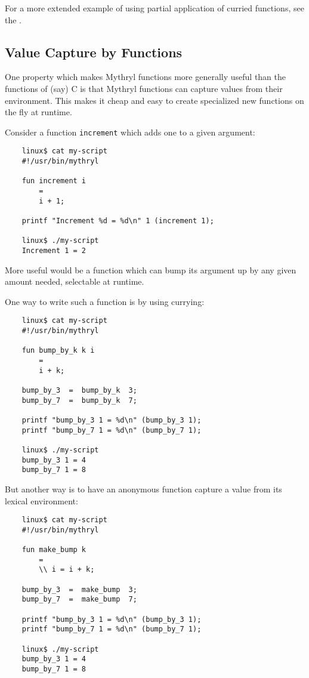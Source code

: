 For a more extended example of using partial application of 
curried functions, see the 
.


\cutend*


\subsection{Value Capture by Functions}
\label{section:ref:functions:value-capture-by-functions}

One property which makes Mythryl functions more generally useful than the 
functions of (say) C is that Mythryl functions can capture values from 
their environment.  This makes it cheap and easy to create specialized 
new functions on the fly at runtime.

Consider a function {\tt increment} which adds one to a given argument:

\begin{verbatim}
    linux$ cat my-script
    #!/usr/bin/mythryl

    fun increment i
        =
        i + 1;

    printf "Increment %d = %d\n" 1 (increment 1);

    linux$ ./my-script
    Increment 1 = 2
\end{verbatim}

More useful would be a function which can bump its argument up 
by any given amount needed, selectable at runtime.

One way to write such a function is by using currying:

\begin{verbatim}
    linux$ cat my-script
    #!/usr/bin/mythryl

    fun bump_by_k k i
        =
        i + k;

    bump_by_3  =  bump_by_k  3;
    bump_by_7  =  bump_by_k  7;

    printf "bump_by_3 1 = %d\n" (bump_by_3 1);
    printf "bump_by_7 1 = %d\n" (bump_by_7 1);

    linux$ ./my-script
    bump_by_3 1 = 4
    bump_by_7 1 = 8
\end{verbatim}

But another way is to have an anonymous function capture a 
value from its lexical environment:

\begin{verbatim}
    linux$ cat my-script
    #!/usr/bin/mythryl

    fun make_bump k
        =
        \\ i = i + k;

    bump_by_3  =  make_bump  3;
    bump_by_7  =  make_bump  7;

    printf "bump_by_3 1 = %d\n" (bump_by_3 1);
    printf "bump_by_7 1 = %d\n" (bump_by_7 1);

    linux$ ./my-script
    bump_by_3 1 = 4
    bump_by_7 1 = 8
\end{verbatim}

